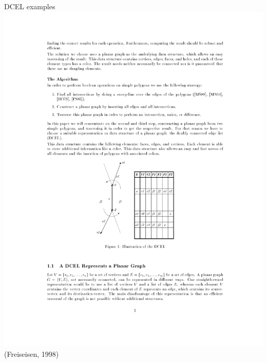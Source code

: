 \documentclass{beamer}
\begin{document}
\begin{frame}{DCEL examples}
    \centering 
    \includegraphics[clip, trim=5cm 9cm 5cm 13cm,width=\linewidth]{figures/dcel01} 
    \flushright \tiny (Freiseisen, 1998)
\end{frame}
\end{document}
